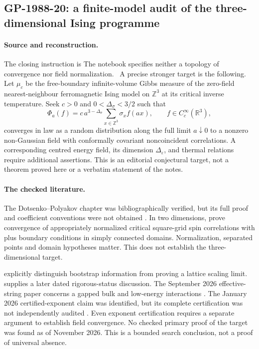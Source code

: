 \subsection{GP-1988-20: a finite-model audit of the three-dimensional Ising programme}
\label{dev:ising-audit}

\paragraph{Source and reconstruction.}
The closing instruction is
The notebook specifies neither a topology of convergence nor field
normalization. \ours\ A precise stronger target is the following.
Let $\mu_c$ be the free-boundary infinite-volume Gibbs measure of the
zero-field nearest-neighbour ferromagnetic Ising model on $\mathbb Z^3$
at its critical inverse temperature. Seek $c>0$ and
$0<\Delta_\sigma<3/2$ such that
\[
 \Phi_a(f)=c\,a^{3-\Delta_\sigma}
     \sum_{x\in\mathbb Z^3}\sigma_x f(ax),
 \qquad f\in C_c^\infty(\mathbb R^3),
\]
converges in law as a random distribution along the full limit
$a\downarrow0$ to a nonzero non-Gaussian field with conformally covariant
noncoincident correlations. A corresponding centred energy field,
its dimension $\Delta_\varepsilon$, and thermal relations require
additional assertions. This is an editorial conjectural target, not
a theorem proved here or a verbatim statement of the notes.

\paragraph{The checked literature.}
The Dotsenko--Polyakov chapter was bibliographically verified, but its
full proof and coefficient conventions were not obtained
\citep{dotsenkopolyakov1988fermion}.
In two dimensions, \citet[Theorem 1.2]{chelkak2015spin} prove convergence
of appropriately normalized critical square-grid spin correlations
with plus boundary conditions in simply connected domains.
Normalization, separated points and domain hypotheses matter.
This does not establish the three-dimensional target.

\citet[section 8.4]{duminilcopin2022hundred} explicitly distinguish
bootstrap information from proving a lattice scaling limit.
\citet[section 4]{kulske2025ising} supplies a later dated rigorous-status
discussion. The September 2026 effective-string paper concerns a gapped
bulk and low-energy interactions
\citep[section 2]{lopesmatospenedones2026strings}.
The January 2026 certified-exponent claim was identified, but its
complete certification was not independently audited
\citep{kai2026certified}. Even exponent certification requires a separate
argument to establish field convergence. No checked primary proof of
the target was found as of November 2026. This is a bounded search
conclusion, not a proof of universal absence.

